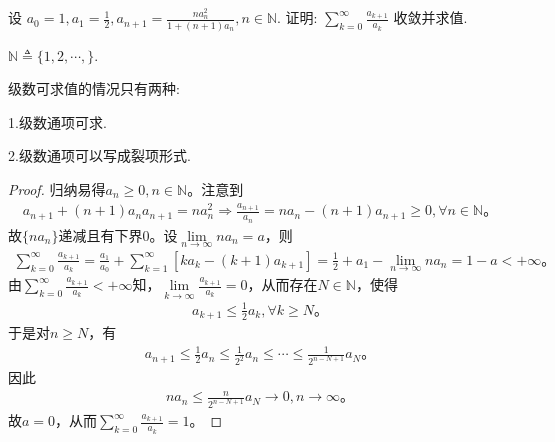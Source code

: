 \documentclass[../../main.tex]{subfiles}
\begin{document}
\begin{example}
设 \( a_0 = 1, a_1 = \frac{1}{2}, a_{n+1} = \frac{n a_n^2}{1 + (n + 1) a_n}, n \in \mathbb{N} \). 证明: \( \sum_{k=0}^{\infty} \frac{a_{k+1}}{a_k} \) 收敛并求值.
\end{example}
\begin{remark}
$\mathbb{N}\triangleq \{1,2,\cdots,\}$.
\end{remark}
\begin{remark}
级数可求值的情况只有两种:

1.级数通项可求.

2.级数通项可以写成裂项形式.
\end{remark}
\begin{proof}
归纳易得$a_n\geqslant 0,n\in \mathbb{N}$。注意到
\begin{align*}
a_{n+1}+\left( n+1 \right) a_na_{n+1}=na_{n}^{2}\Longrightarrow \frac{a_{n+1}}{a_n}=na_n-\left( n+1 \right) a_{n+1}\geqslant 0,\forall n\in \mathbb{N}。
\end{align*}
故$\{ na_n \}$递减且有下界$0$。设$\lim\limits_{n\rightarrow \infty}na_n=a$，则
\begin{align*}
\sum_{k=0}^{\infty}{\frac{a_{k+1}}{a_k}}=\frac{a_1}{a_0}+\sum_{k=1}^{\infty}{\left[ ka_k-\left( k+1 \right) a_{k+1} \right]}=\frac{1}{2}+a_1-\lim\limits_{n\rightarrow \infty}na_n=1-a<+\infty。
\end{align*}
由$\sum_{k=0}^{\infty}{\frac{a_{k+1}}{a_k}}<+\infty$知，$\lim\limits_{k\rightarrow \infty}\frac{a_{k+1}}{a_k}=0$，从而存在$N\in \mathbb{N}$，使得
\begin{align*}
a_{k+1}\leqslant \frac{1}{2}a_k,\forall k\geqslant N。
\end{align*}
于是对$n\geqslant N$，有
\begin{align*}
a_{n+1}\leqslant \frac{1}{2}a_n\leqslant \frac{1}{2^2}a_n\leqslant \cdots \leqslant \frac{1}{2^{n-N+1}}a_N。
\end{align*}
因此
\begin{align*}
na_n\leqslant \frac{n}{2^{n-N+1}}a_N\rightarrow 0,n\rightarrow \infty。
\end{align*}
故$a=0$，从而$\sum_{k=0}^{\infty}{\frac{a_{k+1}}{a_k}}=1$。
\end{proof}
\end{document}
